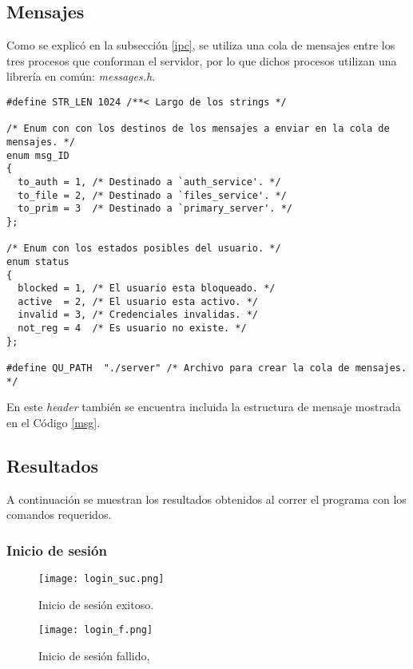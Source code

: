 \documentclass[12pt,a4paper]{article}
\begin{document}
\subsection{Mensajes}
\label{msg_h}
Como se explicó en la subsección \ref{ipc}, se utiliza una cola de mensajes
entre los tres procesos que conforman el servidor, por lo que dichos procesos
utilizan una librería en común: \emph{messages.h}.

\begin{lstlisting}[caption={\emph{Header} para el uso de la cola de mensajes.}, label={msgql}, language=Ce]
#define STR_LEN 1024 /**< Largo de los strings */

/* Enum con con los destinos de los mensajes a enviar en la cola de mensajes. */
enum msg_ID
{
  to_auth = 1, /* Destinado a `auth_service'. */
  to_file = 2, /* Destinado a `files_service'. */
  to_prim = 3  /* Destinado a `primary_server'. */
};

/* Enum con los estados posibles del usuario. */
enum status
{
  blocked = 1, /* El usuario esta bloqueado. */
  active  = 2, /* El usuario esta activo. */
  invalid = 3, /* Credenciales invalidas. */
  not_reg = 4  /* Es usuario no existe. */
};

#define QU_PATH  "./server" /* Archivo para crear la cola de mensajes. */
\end{lstlisting}

En este \emph{header} también se encuentra incluida la estructura de mensaje
mostrada en el Código \ref{msg}.

\subsection{Resultados}
\label{resultados}
A continuación se muestran los resultados obtenidos al correr el programa con
los comandos requeridos.

\subsubsection{Inicio de sesión}
\label{login}

\begin{figure}[H]
  \centering
  \texttt{[image: login\_suc.png]}
  \caption{Inicio de sesión exitoso.}
  \label{log_suc}
\end{figure}

\begin{figure}[H]
  \centering
  \texttt{[image: login\_f.png]}
  \caption{Inicio de sesión fallido,}
  \label{log_f}
\end{figure}
\end{document}
